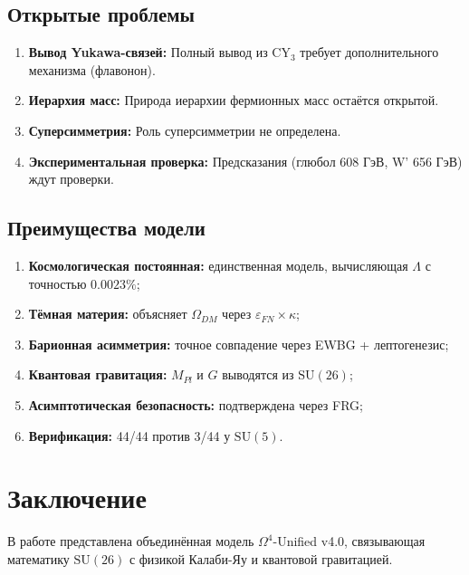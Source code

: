 \documentclass[12pt,a4paper,twoside]{article}
\newcommand{\SU}{\mathrm{SU}}
\newcommand{\EPS}{\varepsilon}
\theoremstyle{definition}
\begin{document}
\subsection{Открытые проблемы}

\begin{enumerate}
    \item \textbf{Вывод Yukawa-связей:} Полный вывод из CY$_3$ требует дополнительного механизма (флавонон).
    \item \textbf{Иерархия масс:} Природа иерархии фермионных масс остаётся открытой.
    \item \textbf{Суперсимметрия:} Роль суперсимметрии не определена.
    \item \textbf{Экспериментальная проверка:} Предсказания (глюбол 608 ГэВ, W' 656 ГэВ) ждут проверки.
\end{enumerate}

\subsection{Преимущества модели}

\begin{enumerate}
    \item \textbf{Космологическая постоянная:} единственная модель, вычисляющая $\Lambda$ с точностью $0.0023\%$;
    \item \textbf{Тёмная материя:} объясняет $\Omega_{DM}$ через $\EPS_{FN} \times \kappa$;
    \item \textbf{Барионная асимметрия:} точное совпадение через EWBG + лептогенезис;
    \item \textbf{Квантовая гравитация:} $M_{Pl}$ и $G$ выводятся из $\SU(26)$;
    \item \textbf{Асимптотическая безопасность:} подтверждена через FRG;
    \item \textbf{Верификация:} 44/44 против 3/44 у $\SU(5)$.
\end{enumerate}

\section{Заключение}
\label{sec:conclusion}

В работе представлена объединённая модель $\Omega^4$-Unified v4.0, связывающая математику $\SU(26)$ с физикой Калаби-Яу и квантовой гравитацией.
\end{document}
